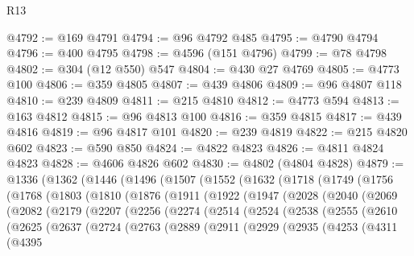 \begin{lexlean}{R13}
\begin{coremodule}
@4792 := @169 @4791
@4794 := @96 @4792 @485
@4795 := @4790 @4794
@4796 := @400 @4795
@4798 := @4596 (@151 @4796)
@4799 := @78 @4798
@4802 := @304 (@12 @550) @547
@4804 := @430 @27 @4769
@4805 := @4773 @100
@4806 := @359 @4805
@4807 := @439 @4806
@4809 := @96 @4807 @118
@4810 := @239 @4809
@4811 := @215 @4810
@4812 := @4773 @594
@4813 := @163 @4812
@4815 := @96 @4813 @100
@4816 := @359 @4815
@4817 := @439 @4816
@4819 := @96 @4817 @101
@4820 := @239 @4819
@4822 := @215 @4820 @602
@4823 := @590 @850
@4824 := @4822 @4823
@4826 := @4811 @4824 @4823
@4828 := @4606 @4826 @602
@4830 := @4802 (@4804 @4828)
@4879 := @1336
    (@1362
      (@1446
        (@1496
          (@1507
            (@1552
              (@1632
                (@1718
                  (@1749
                    (@1756
                      (@1768
                        (@1803
                          (@1810
                            (@1876
                              (@1911
                                (@1922
                                  (@1947
                                    (@2028
                                      (@2040
                                        (@2069
                                          (@2082
                                            (@2179
                                              (@2207
                                                (@2256
                                                  (@2274
                                                    (@2514
                                                      (@2524
                                                        (@2538
                                                          (@2555
                                                            (@2610
                                                              (@2625
                                                                (@2637
                                                                  (@2724
                                                                    (@2763
                                                                      (@2889
                                                                        (@2911
                                                                          (@2929
                                                                            (@2935
                                                                              (@4253
                                                                                (@4311
                                                                                  (@4395

\end{coremodule}
\end{lexlean}
